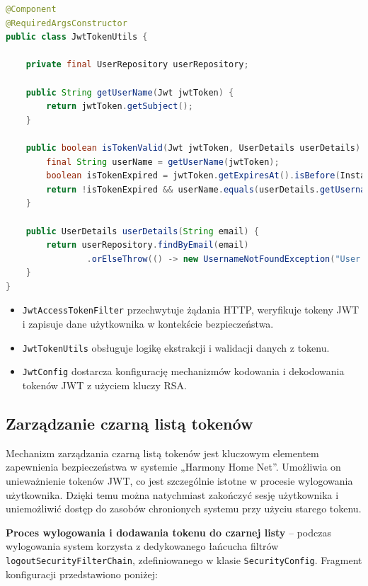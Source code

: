 \begin{lstlisting}[language=Java, style=JavaStyle, caption=Klasa \texttt{JwtTokenUtils}]
@Component
@RequiredArgsConstructor
public class JwtTokenUtils {

    private final UserRepository userRepository;

    public String getUserName(Jwt jwtToken) {
        return jwtToken.getSubject();
    }

    public boolean isTokenValid(Jwt jwtToken, UserDetails userDetails) {
        final String userName = getUserName(jwtToken);
        boolean isTokenExpired = jwtToken.getExpiresAt().isBefore(Instant.now());
        return !isTokenExpired && userName.equals(userDetails.getUsername());
    }

    public UserDetails userDetails(String email) {
        return userRepository.findByEmail(email)
                .orElseThrow(() -> new UsernameNotFoundException("User not found"));
    }
}
\end{lstlisting}

\begin{itemize}
    \item \texttt{JwtAccessTokenFilter} przechwytuje żądania HTTP, weryfikuje tokeny JWT i zapisuje dane użytkownika w kontekście bezpieczeństwa.
    \item \texttt{JwtTokenUtils} obsługuje logikę ekstrakcji i walidacji danych z tokenu.
    \item \texttt{JwtConfig} dostarcza konfigurację mechanizmów kodowania i dekodowania tokenów JWT z użyciem kluczy RSA.
\end{itemize}


\subsection{Zarządzanie czarną listą tokenów}

Mechanizm zarządzania czarną listą tokenów jest kluczowym elementem zapewnienia bezpieczeństwa w systemie „Harmony Home Net”. Umożliwia on unieważnienie tokenów JWT, co jest szczególnie istotne w procesie wylogowania użytkownika. Dzięki temu można natychmiast zakończyć sesję użytkownika i uniemożliwić dostęp do zasobów chronionych systemu przy użyciu starego tokenu.

\textbf{Proces wylogowania i dodawania tokenu do czarnej listy} -- podczas wylogowania system korzysta z dedykowanego łańcucha filtrów \texttt{logoutSecurityFilterChain}, zdefiniowanego w klasie \texttt{SecurityConfig}. Fragment konfiguracji przedstawiono poniżej:

